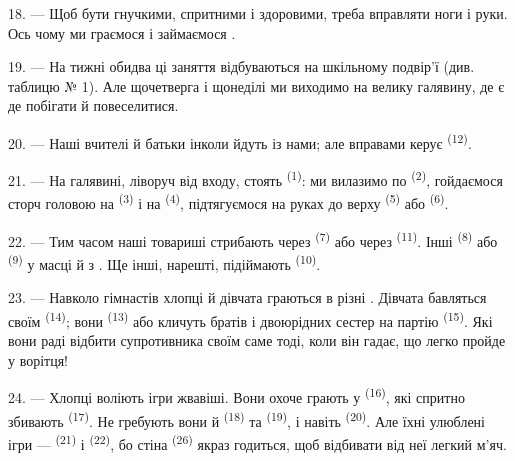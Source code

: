 \VUsaut{5.0mm}
\VUsaut{2.4mm}
\VUsaut{3.0mm}

18. --- Щоб бути гнучкими, спритними і здоровими, треба вправляти ноги і руки.
Ось чому ми граємося і займаємося .

19. --- На тижні обидва ці заняття відбуваються на шкільному подвір'ї (див.
таблицю № 1). Але щочетверга і щонеділі ми виходимо на велику галявину, де є де
побігати й повеселитися.

20. --- Наші вчителі й батьки інколи йдуть із нами; але вправами керує
 \textsuperscript{(12)}.

21. --- На галявині, ліворуч від входу, стоять 
\textsuperscript{(1)}: ми вилазимо по  \textsuperscript{(2)},
гойдаємося сторч головою на  \textsuperscript{(3)} і на
 \textsuperscript{(4)}, підтягуємося на руках до верху
 \textsuperscript{(5)} або 
\textsuperscript{(6)}.

22. --- Тим часом наші товариші стрибають через 
\textsuperscript{(7)} або через  \textsuperscript{(11)}. Інші
 \textsuperscript{(8)} або 
\textsuperscript{(9)} у масці й з . Ще інші, нарешті, підіймають
 \textsuperscript{(10)}.

\VUsaut{4.6mm}
\VUsaut{3.0mm}

23. --- Навколо гімнастів хлопці й дівчата граються в різні .
Дівчата бавляться своїм  \textsuperscript{(14)}; вони
 \textsuperscript{(13)} або кличуть братів і
двоюрідних сестер на партію  \textsuperscript{(15)}. Які вони
раді відбити  супротивника своїм  саме
тоді, коли він гадає, що легко пройде у ворітця!

24. --- Хлопці воліють ігри жвавіші. Вони охоче грають у 
\textsuperscript{(16)}, які спритно збивають 
\textsuperscript{(17)}. Не гребують вони й 
\textsuperscript{(18)} та  \textsuperscript{(19)}, і навіть
 \textsuperscript{(20)}. Але їхні улюблені ігри ---
 \textsuperscript{(21)} і 
\textsuperscript{(22)}, бо стіна  \textsuperscript{(26)} якраз
годиться, щоб відбивати від неї легкий м'яч.

